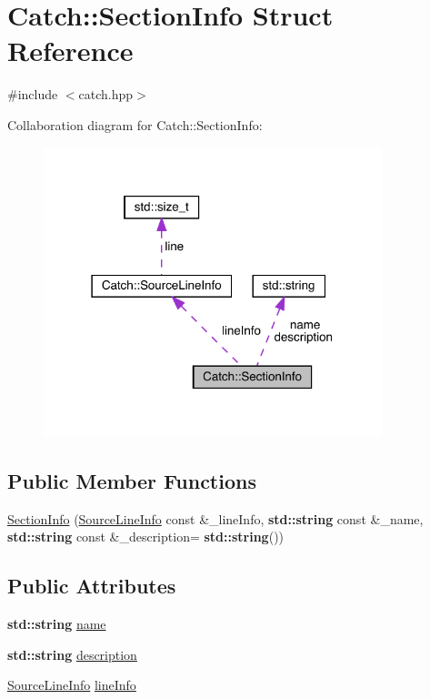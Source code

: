 \hypertarget{struct_catch_1_1_section_info}{}\section{Catch\+:\+:Section\+Info Struct Reference}
\label{struct_catch_1_1_section_info}


{\ttfamily \#include $<$catch.\+hpp$>$}



Collaboration diagram for Catch\+:\+:Section\+Info\+:
\nopagebreak
\begin{figure}[H]
\begin{center}
\leavevmode
\includegraphics[width=279pt]{struct_catch_1_1_section_info__coll__graph}
\end{center}
\end{figure}
\subsection*{Public Member Functions}
\begin{DoxyCompactItemize}
\item 
\hyperlink{struct_catch_1_1_section_info_a27aff3aaf8b6611f3651b17111a272c6}{Section\+Info} (\hyperlink{struct_catch_1_1_source_line_info}{Source\+Line\+Info} const \&\+\_\+line\+Info, \textbf{ std\+::string} const \&\+\_\+name, \textbf{ std\+::string} const \&\+\_\+description=\textbf{ std\+::string}())
\end{DoxyCompactItemize}
\subsection*{Public Attributes}
\begin{DoxyCompactItemize}
\item 
\textbf{ std\+::string} \hyperlink{struct_catch_1_1_section_info_a704c8fc662d309137e0d4f199cb7df58}{name}
\item 
\textbf{ std\+::string} \hyperlink{struct_catch_1_1_section_info_a0052060219a6de74bb7ade34d4163a4e}{description}
\item 
\hyperlink{struct_catch_1_1_source_line_info}{Source\+Line\+Info} \hyperlink{struct_catch_1_1_section_info_adbc83b8a3507c4acc8ee249e93465711}{line\+Info}
\end{DoxyCompactItemize}


